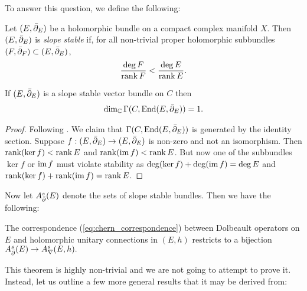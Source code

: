 \documentclass[12pt]{ociamthesis}  %
\begin{document}
To answer this question, we define the following:
\begin{definition}\label{def:stable_bundle}
  Let $(E,{\bar{\partial}}_E)$ be a holomorphic bundle on a compact complex
  manifold $X$. Then $(E,{\bar{\partial}}_E)$ is \emph{slope stable}
  if, for all non-trivial proper holomorphic subbundles
  $(F,{\bar{\partial}}_F)\subset (E,{\bar{\partial}}_E)$,
  \begin{align}\label{eq:stability}
    \frac{\deg F}{\operatorname{rank} F} < \frac{\deg E}{\operatorname{rank} E}.
  \end{align}
\end{definition}

\begin{lemma}\label{lem:stable_is_simple}
  If $(E,{\bar{\partial}}_E)$ is a slope stable vector bundle on $C$ then
  \begin{align*}
    \dim_{\mathbb C}\Gamma(C,\operatorname{End}(E,{\bar{\partial}}_E)) = 1.
  \end{align*}
  \begin{proof}
    Following \cite[Proposition 5.30]{neitzke2021}.
    We claim that $\Gamma(C,\operatorname{End}(E,{\bar{\partial}}_E))$ is generated by the
    identity section.
    Suppose $f : (E,{\bar{\partial}}_E) \to (E,{\bar{\partial}}_E)$ is non-zero and not an
    isomorphism. Then $\operatorname{rank}(\ker f) < \operatorname{rank} E$ and
    $\operatorname{rank}(\operatorname{im} f) < \operatorname{rank} E$. But now one of the subbundles $\ker f$
    or $\operatorname{im} f$ must violate stability as
    $\deg(\ker f) + \deg(\operatorname{im} f) = \deg E$ and
    $\operatorname{rank}(\ker f) + \operatorname{rank}(\operatorname{im} f) = \operatorname{rank} E$.
    \missingproof
  \end{proof}
\end{lemma}


Now let $A^s_{\bar{\partial}}(E)$ denote the sets of slope stable bundles. Then we
have the following:

\begin{theorem}\label{thm:duy}
  The correspondence (\ref{eq:chern_correspondence}) between
  Dolbeault operators on $E$ and holomorphic unitary connections in $(E,h)$
  restricts to a bijection $A^s_{\bar{\partial}}(E) \to A^s_\nabla(E,h).$
\end{theorem}

This theorem is highly non-trivial and we are not going to attempt
to prove it. Instead, let us outline a few more general results
that it may be derived from:
\end{document}
